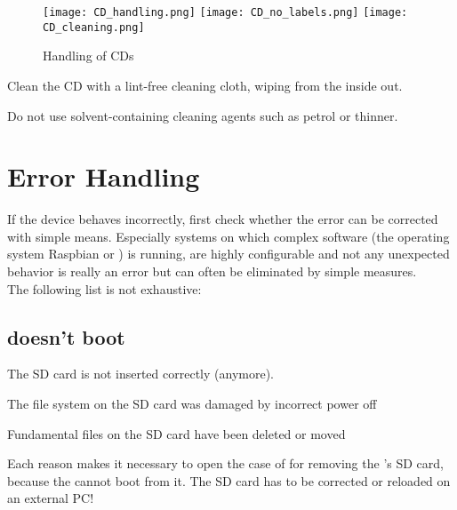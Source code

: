 \begin{figure}[h]
\centering
\texttt{[image: CD\_handling.png]}
\texttt{[image: CD\_no\_labels.png]}
\texttt{[image: CD\_cleaning.png]}
\caption{Handling of CDs}
\label{fig:CDhandling}
\end{figure}

\begin{compactitem}
\item{Clean the CD with a lint-free cleaning cloth, wiping from the inside out.}
\item{Do not use solvent-containing cleaning agents such as petrol or thinner.}
\end{compactitem}


\newpage
\section{Error Handling}
If the device behaves incorrectly, first check whether the error can be
corrected with simple means. Especially systems on which complex 
software (\eg the operating system Raspbian or {\audacious}) is running,
are highly configurable and not any unexpected behavior is really an
error but can often be eliminated by simple measures.\\
The following list is not exhaustive:

\subsection{{\Bezeichnung} doesn't boot}
\begin{compactitem}
\item{The SD card is not inserted correctly (anymore).}
\item{The file system on the SD card was damaged by incorrect power off}
\item{Fundamental files on the SD card have been deleted or moved}
\end{compactitem}
Each reason makes it necessary to open the case of {\Bezeichnung} for 
removing the {\RPi}'s SD card, because the {\RPi} cannot boot from it.
The SD card has to be corrected or reloaded on an external PC!

